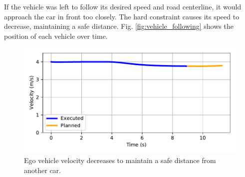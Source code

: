 \documentclass[letterpaper, 10 pt, conference]{ieeeconf}  %
\begin{document}
If the vehicle was left to follow its desired speed and road centerline, it would approach the car in front too closely. The hard constraint causes its speed to decrease, maintaining a safe distance. Fig. \ref{fig:vehicle_following} shows the position of each vehicle over time.
 
 \begin{figure}[h!]
	\centering
	\includegraphics[width=0.8\linewidth]{figures/vehicle_following_velocity.pdf}
	\caption{Ego vehicle velocity decreases to maintain a safe distance from another car.}		\label{fig:vehicle_following_velocity}
\end{figure}
\end{document}
